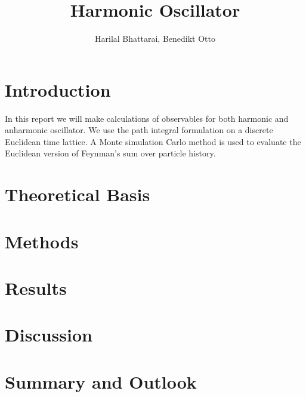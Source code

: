 \documentclass{article}
\title{Harmonic Oscillator}
\author{Harilal Bhattarai, Benedikt Otto}
\begin{document}
	\maketitle
	\newpage
	\begin{abstract}
	\end{abstract}
	\section{Introduction}
In this report we will make calculations of observables for both harmonic and anharmonic oscillator. We use the path integral formulation on a discrete Euclidean time lattice. A Monte simulation Carlo method is used to evaluate the Euclidean version of Feynman’s sum over particle history.
	\section{Theoretical Basis}
	\section{Methods}
	\section{Results}
	\section{Discussion}
	\section{Summary and Outlook}
\end{document}

